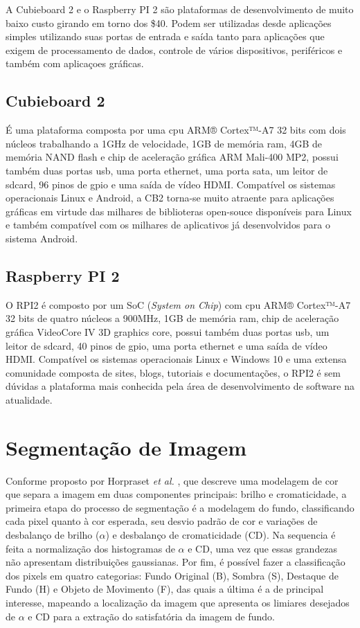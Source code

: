 \documentclass[conference]{IEEEtran}
\begin{document}
A Cubieboard 2 e o Raspberry PI 2 são plataformas de desenvolvimento de muito baixo custo girando em torno dos \$40. Podem ser utilizadas desde aplicações simples utilizando suas portas de entrada e saída tanto para aplicações que exigem de processamento de dados, controle de vários dispositivos, periféricos e também com aplicaçoes gráficas.

\subsection{Cubieboard 2}
É uma plataforma composta por uma cpu ARM® Cortex™-A7 32 bits com dois núcleos trabalhando a 1GHz de velocidade, 1GB de memória ram, 4GB de memória NAND flash e chip de aceleração gráfica ARM Mali-400 MP2, possui também duas portas usb, uma porta ethernet, uma porta sata, um leitor de sdcard, 96 pinos de gpio e uma saída de vídeo HDMI. Compatível os sistemas operacionais Linux e Android, a CB2 torna-se muito atraente para aplicações gráficas em virtude das milhares de biblioteras open-souce disponíveis para Linux e também compatível com os milhares de aplicativos já desenvolvidos para o sistema Android.


\subsection{Raspberry PI 2}
O RPI2  é composto por um SoC (\textit{System on Chip}) com cpu ARM® Cortex™-A7 32 bits de quatro núcleos a 900MHz, 1GB de memória ram, chip de aceleração gráfica VideoCore IV 3D graphics core, possui também duas portas usb, um leitor de sdcard, 40 pinos de gpio, uma porta ethernet e uma saída de vídeo HDMI. Compatível os sistemas operacionais Linux e Windows 10 e uma extensa comunidade composta de sites, blogs, tutoriais e documentações, o RPI2 é sem dúvidas a plataforma mais conhecida pela área de desenvolvimento de software na atualidade.


\section{Segmentação de Imagem}
Conforme proposto por Horpraset \textit{et al.} \cite{IEEEhowto:horprasert}, que descreve uma modelagem de cor que separa a imagem em duas componentes principais: brilho e cromaticidade, a primeira etapa do processo de segmentação é a modelagem do fundo, classificando cada pixel quanto à cor esperada, seu desvio padrão de cor e variações de desbalanço de brilho (\(\alpha\)) e desbalanço de cromaticidade (CD). Na sequencia é feita a normalização dos histogramas de \(\alpha\) e CD, uma vez que essas grandezas não apresentam distribuições gaussianas. Por fim, é possível fazer a classificação dos pixels em quatro categorias: Fundo Original (B), Sombra (S), Destaque de Fundo (H) e Objeto de Movimento (F), das quais a última é a de principal interesse, mapeando a localização da imagem que apresenta os limiares desejados de \(\alpha\) e CD para a extração do satisfatória da imagem de fundo.
\end{document}
